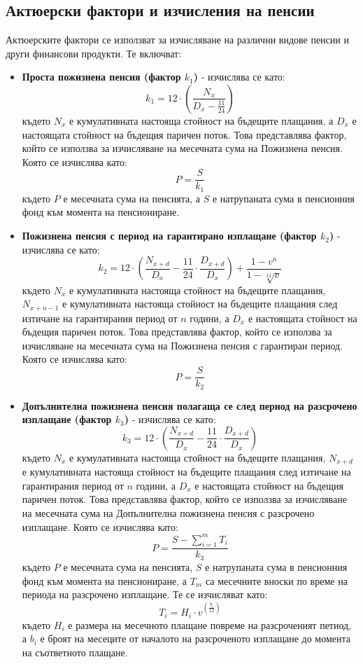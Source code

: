 \documentclass[a4paper,12pt]{article}
\begin{document}
\subsection{Актюерски фактори и изчисления на пенсии}
Актюерските фактори се използват за изчисляване на различни видове пенсии и други финансови продукти. Те включват:
\begin{itemize}
        \item \textbf{Проста пожизнена пенсия (фактор $k_1$)} - изчислява се като:
              \[k_1 = 12\cdot\left(\frac{N_{x}}{D_{x}-\frac{11}{24}}\right)\]
              където $N_x$ е кумулативната настояща стойност на бъдещите плащания, а $D_x$ е настоящата стойност на бъдещия паричен поток. Това представлява фактор, който се използва за изчисляване на месечната сума на Пожизнена пенсия. Която се изчислява като:
              \[P = \frac{S}{k_1}\]
              където $P$ е месечната сума на пенсията, а $S$ е натрупаната сума в пенсионния фонд към момента на пенсиониране.
        \item \textbf{Пожизнена пенсия с  период на гарантирано изплащане (фактор $k_2$)} - изчислява се като:
              \[k_2 = 12\cdot\left(\frac{N_{x+d}}{D_x} - \frac{11}{24}\cdot \frac{D_{x+d}}{D_{x}}\right)+\frac{1-v^n}{1-\sqrt[12]{v}}\]
              където $N_x$ е кумулативната настояща стойност на бъдещите плащания, $N_{x+n-1}$ е кумулативната настояща стойност на бъдещите плащания след изтичане на гарантирания период от $n$ години, а $D_x$ е настоящата стойност на бъдещия паричен поток. Това представлява фактор, който се използва за изчисляване на месечната сума на Пожизнена пенсия с гарантиран период. Която се изчислява като:
              \[P = \frac{S}{k_2}\]
        \item \textbf{Допълнителна пожизнена пенсия полагаща се след период на разсрочено изплащане (фактор $k_3$)} - изчислява се като:
              \[k_3 = 12\cdot\left(\frac{N_{x+d}}{D_{x}} - \frac{11}{24}\cdot\frac{
                              D_{x+d}}{D_{x}}\right)\]
              където $N_x$ е кумулативната настояща стойност на бъдещите плащания, $N_{x+d}$ е кумулативната настояща стойност на бъдещите плащания след изтичане на гарантирания период от $n$ години, а $D_x$ е настоящата стойност на бъдещия паричен поток. Това представлява фактор, който се използва за изчисляване на месечната сума на Допълнителна пожизнена пенсия с разсрочено изплащане. Която се изчислява като:
              \[P = \frac{S-\sum_{i=1}^{m}T_i}{k_3}\]
              където $P$ е месечната сума на пенсията, $S$ е натрупаната сума в пенсионния фонд към момента на пенсиониране, а $T_m$ са месечните вноски по време на периода на разсрочено изплащане. Те се изчисляват като:
              \[T_i= H_i \cdot v^{(\frac{b_i}{12})}\]
              където $H_i$ е размера на месечното плащане повреме на разсроченият петиод, а $b_i$ е броят на месеците от началото на разсроченото изплащане до момента на съответното плащане.
\end{itemize}
\newpage
\end{document}
